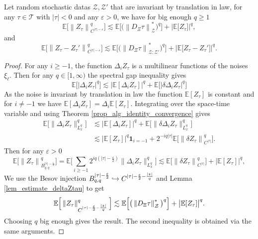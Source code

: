 \documentclass[11pt]{preprint}
\newcommand{\mcZ}{\mathcal{Z}}
\newcommand{\mcT}{\mathcal{T}}
\def\one{\mathbf{1}}
\def\eps{\varepsilon}
\let\eps\varepsilon
\newcommand{\norme}[1]{\left\lVert #1 \right\lVert}
\newcommand{\bbE}{\mathbb{E}}
\begin{document}
\begin{lemma}\label{lem_spectralgap_argument}
	Let random stochastic datas $\mcZ,\mcZ'$ that are invariant by translation in law, for any $\tau\in\mcT$ with $|\tau|<0$ and any $\eps>0$, we have for  big enough $q\geq 1$
	$$
	\bbE\Big[\norme{Z_\tau}_{C^{|\tau|-\eps}}^q\Big] \lesssim  \bbE\Big[\big(\norme{D_\Xi\tau}^*_\mcZ\big)^q\Big] +  \Big|\bbE\big[Z_\tau\big]\Big|^q,
	$$
	and 
	$$
	\bbE\Big[\norme{Z_\tau-Z_\tau'}_{C^{|\tau|-\eps}}^q\Big] \lesssim  \bbE\Big[\big(\norme{D_\Xi\tau}^*_{\mcZ:\mcZ'}\big)^q\Big] + \Big|  \bbE\big[Z_\tau-Z_\tau'\big]   \Big|^q.
	$$
\end{lemma}

\begin{proof}
For any $i\geq-1$, the function $\Delta_i Z_\tau$ is a multilinear functions of the noises $\xi_\ell$. Then for any $q\in [1,\infty)$ the spectral gap inequality gives
$$
\mathbb{E}\Big[|\Delta_iZ_\tau|^q\Big] \lesssim  \Big| \bbE[\Delta_i Z_\tau]\Big|^q  + \mathbb{E}\Big[|\delta\Delta_iZ_\tau|^q\Big]
$$
As the noise is invariant by translation in law the function $\bbE[Z_\tau]$ is constant and for $i\ne-1$ we have $\bbE[\Delta_iZ_\tau] =\Delta_i\bbE[Z_\tau]$. 
Integrating over the space-time variable and using Theorem \ref{prop_alg_identity_convergence} gives 
\begin{align*}
\mathbb{E}\Big[\lVert\Delta_iZ_\tau\lVert_{L^q_x}^q\Big] &\lesssim \big| \bbE[\Delta_i Z_\tau]\big|^q +  \mathbb{E}\Big[\lVert\delta\Delta_iZ_\tau\lVert_{L^q_x}^q\Big]
\\&\lesssim  \big|\bbE[Z_\tau ]\big|^q \one_{i=-1} +
 2^{-iq|\tau|} \bbE\Big[\norme{\delta Z_\tau}_{C^{|\tau|}}^q\Big]  .
\end{align*}
Then for any $\eps>0$
 $$
 \mathbb{E}\Big[\norme{Z_\tau}^q_{B^{|\tau|-\frac{\eps}{2}}_{q,q}}  \Big] = \mathbb{E}\Big[\sum_{i\geq -1} 2^{iq(|\tau|-\frac{\eps}{2})} \lVert\Delta_iZ_\tau\lVert_{L^q_x}^q \Big]\lesssim \bbE\Big[\norme{\delta Z_\tau}_{C^{|\tau|}}^q\Big] + \big|\bbE[Z_\tau]\big|^q,
 $$
We use the Besov injection $B^{|\tau|-\frac{\eps}{2}}_{q,q} \hookrightarrow C^{|\tau|-\frac{\eps}{2}-\frac{|\frak s|}{q}}$ and Lemma \ref{lem_estimate_deltaZtau} to get 
$$
\mathbb{E}\Big[\norme{Z_\tau}^q_{C^{|\tau|-\frac{\eps}{2}-\frac{|\frak s|}{q}}}\Big]\lesssim \bbE\Big[\big(\norme{D_\Xi\tau}^*_\mcZ\big)^q\Big] + \big|\bbE[Z_\tau]\big|^q.
$$ 
Choosing $q$ big enough gives the result. The second inequality is obtained via the same arguments.
\end{proof}
\end{document}
